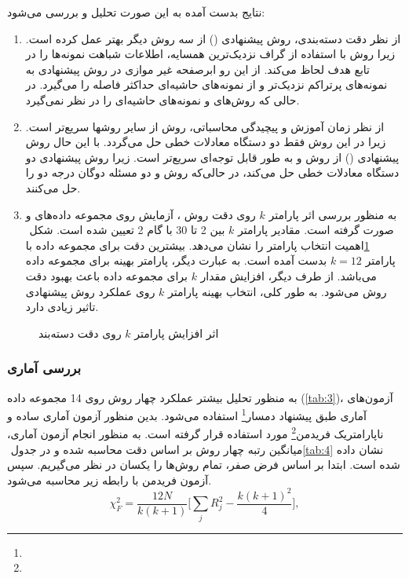 نتایج بدست آمده به این صورت تحلیل و بررسی می‌شود:
\begin{enumerate}
	\item از نظر دقت دسته‌بندی، روش پیشنهادی () از سه روش دیگر بهتر عمل کرده است. زیرا روش  با استفاده از گراف نزدیک‌ترین همسایه، اطلاعات شباهت نمونه‌ها را در تابع هدف لحاظ می‌کند. از این رو ابرصفحه غیر موازی در روش پیشنهادی به نمونه‌های پرتراکم نزدیک‌تر و از نمونه‌های حاشیه‌ای حداکثر فاصله را می‌گیرد. در حالی که روش‌های  و   نمونه‌های حاشیه‌ای را در نظر نمی‌گیرد.
	\item از نظر زمان آموزش و پیچیدگی محاسباتی، روش  از سایر روشها سریع‌تر است. زیرا در این روش فقط دو دستگاه معادلات خطی حل می‌گردد. با این حال روش پیشنهادی () از روش  و  به طور قابل توجه‌ای سریع‌تر است. زیرا روش پیشنهادی دو دستگاه معادلات خطی حل می‌کند، در حالی‌که روش  و  دو مسئله دوگان درجه دو را حل می‌کنند.
	\item به منظور بررسی اثر پارامتر  $k$ روی دقت روش ، آزمایش روی مجموعه داده‌های  و  صورت گرفته است. مقادیر پارامتر  $k$ بین 2 تا 30 با گام 2 تعیین شده است. شکل ‏ \ref{fig:KNN-LSTSVM-Aust-Hepa}اهمیت انتخاب پارامتر   را نشان می‌دهد. بیشترین دقت برای مجموعه داده  با پارامتر  $k=12$ بدست آمده است. به عبارت دیگر،  پارامتر بهینه برای مجموعه داده  می‌باشد. از طرف دیگر، افزایش مقدار  $k$ برای مجموعه داده  باعث بهبود دقت روش  می‌شود. به طور کلی، انتخاب بهینه پارامتر  $k$ روی عملکرد روش پیشنهادی تاثیر زیادی دارد.
\end{enumerate}

\begin{figure}[!t]
	\centering
	\caption{اثر افزایش پارامتر $k$ روی دقت دسته‌بند }
	\label{fig:KNN-LSTSVM-Aust-Hepa}
\end{figure}

\subsubsection{بررسی آماری}\label{sec:5:2:3:1}
به منظور تحلیل بیشتر عملکرد چهار روش روی 14 مجموعه داده (\ref{tab:3})، آزمون‌های آماری طبق پیشنهاد دمسار\footnote{} \cite{demsar2006} استفاده می‌شود. بدین منظور آزمون آماری ساده و ناپارامتریک فریدمن\footnote{}  مورد استفاده قرار گرفته است. به منظور انجام آزمون آماری، میانگین رتبه چهار روش بر اساس دقت محاسبه شده و در جدول ‏\ref{tab:4} نشان داده شده است. ابتدا بر اساس فرض صفر، تمام روش‌ها را یکسان در نظر می‌گیریم. سپس آزمون فریدمن با رابطه زیر محاسبه می‌شود.
\begin{equation}\label{eq:5:1}
\chi^2_F = \frac{12N}{k(k + 1)}\bigg[\sum_{j} R^2_j - \frac{k(k + 1)^2}{4} \bigg],
\end{equation}

